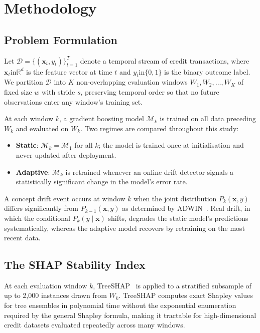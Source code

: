 \documentclass[pdflatex,sn-mathphys-num]{sn-jnl}
\theoremstyle{thmstyleone}
\theoremstyle{thmstyletwo}
\theoremstyle{thmstylethree}
\begin{document}
\section{Methodology}\label{sec:method}

\subsection{Problem Formulation}\label{sec:method:problem}

Let $\mathcal{D} = \{(\mathbf{x}_t, y_t)\}_{t=1}^{T}$ denote a temporal stream
of credit transactions, where $\mathbf{x}_t \mathbin{\mathrm{in}} \mathbb{R}^d$ is the feature
vector at time $t$ and $y_t \mathbin{\mathrm{in}} \{0, 1\}$ is the binary outcome label. We
partition $\mathcal{D}$ into $K$ non-overlapping evaluation windows
$W_1, W_2, \ldots, W_K$ of fixed size $w$ with stride $s$, preserving temporal
order so that no future observations enter any window's training set.

At each window $k$, a gradient boosting model $\mathcal{M}_k$ is trained on all
data preceding $W_k$ and evaluated on $W_k$. Two regimes are compared throughout
this study:
\begin{itemize}
  \item \textbf{Static}: $\mathcal{M}_k = \mathcal{M}_1$ for all $k$; the model
        is trained once at initialisation and never updated after deployment.
  \item \textbf{Adaptive}: $\mathcal{M}_k$ is retrained whenever an online drift
        detector signals a statistically significant change in the model's error
        rate.
\end{itemize}

A concept drift event occurs at window $k$ when the joint distribution
$P_k(\mathbf{x}, y)$ differs significantly from $P_{k-1}(\mathbf{x}, y)$ as
determined by ADWIN~\cite{bifet2007adwin}. Real drift, in which the conditional
$P_k(y \mid \mathbf{x})$ shifts, degrades the static model's predictions
systematically, whereas the adaptive model recovers by retraining on the most
recent data.

\subsection{The SHAP Stability Index}\label{sec:method:ssi}

At each evaluation window $k$, TreeSHAP~\cite{lundberg2020trees} is applied to
a stratified subsample of up to 2,000 instances drawn from $W_k$. TreeSHAP
computes exact Shapley values for tree ensembles in polynomial time without the
exponential enumeration required by the general Shapley formula, making it
tractable for high-dimensional credit datasets evaluated repeatedly across
many windows.
\end{document}
